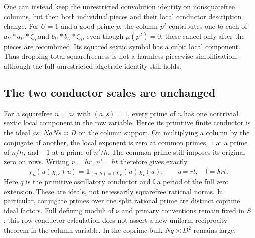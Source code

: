 \documentclass[11pt]{article}
\theoremstyle{definition}\newtheorem{definition}[theorem]{Definition}
\theoremstyle{remark}\newtheorem{remark}[theorem]{Remark}
\begin{document}
One can instead keep the unrestricted convolution identity on nonsquarefree
columns, but then both individual pieces and their local conductor
description change. For $U=1$ and a good prime $p$, the column $p^2$
contributes one to each of $a_U*a_U*\zeta_0$ and
$b_U*b_U*\zeta_0$, even though $\mu(p^2)=0$; these cancel only after
the pieces are recombined. Its squared sextic symbol has a cubic local
component. Thus dropping total squarefreeness is not a harmless
piecewise simplification, although the full unrestricted algebraic
identity still holds.

\subsection{The two conductor scales are unchanged}
For a squarefree $n=as$ with $(a,s)=1$, every prime of $n$ has one
nontrivial sextic local component in the row variable. Hence its primitive
finite conductor is the ideal $as$; $NaNs\asymp D$ on the column support.
On multiplying a column by the conjugate of another, the local exponent
is zero at common primes, $1$ at a prime of $n/h$, and $-1$ at a prime
of $n'/h$. The common prime still imposes its original zero on rows.
Writing $n=h r$, $n'=h t$ therefore gives exactly
\[
 \chi_n(u)\overline{\chi_{n'}(u)}
 =\mathbf1_{(u,h)=1}\chi_r(u)\overline{\chi_t(u)},\qquad
 q=rt,\quad\mathfrak l=hrt.
\]
Here $q$ is the primitive oscillatory conductor and $\mathfrak l$ a
period of the full zero extension. These are ideals, not necessarily
squarefree rational norms. In particular, conjugate primes over one split
rational prime are distinct coprime ideal factors. Full defining moduli
of $\nu$ and primary conventions remain fixed in $S$; this row-conductor
calculation does not assert a new uniform reciprocity theorem in the
column variable. In the coprime bulk $Nq\asymp D^2$ remains large.
\end{document}
